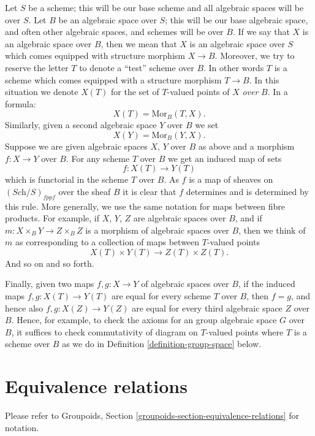 \noindent
Let $S$ be a scheme; this will be our base scheme and all algebraic spaces
will be over $S$. Let $B$ be an algebraic space over $S$; this will be our
base algebraic space, and often other algebraic spaces, and schemes will
be over $B$. If we say that $X$ is an algebraic space over $B$, then we
mean that $X$ is an algebraic space over $S$ which comes equipped with
structure morphism $X \to B$. Moreover, we try to reserve the letter $T$
to denote a ``test'' scheme over $B$. In other words $T$ is a scheme
which comes equipped with a structure morphism $T \to B$.
In this situation we denote $X(T)$ for the set of $T$-valued points of
$X$ {\it over} $B$. In a formula:
$$
X(T) = \text{Mor}_B(T, X).
$$
Similarly, given a second algebraic space $Y$ over $B$ we set
$$
X(Y) = \text{Mor}_B(Y, X).
$$
Suppose we are given algebraic spaces $X$, $Y$ over $B$ as above and a
morphism $f : X \to Y$ over $B$. For any scheme $T$ over $B$ we get an
induced map of sets
$$
f : X(T) \longrightarrow Y(T)
$$
which is functorial in the scheme $T$ over $B$.
As $f$ is a map of sheaves on $(\textit{Sch}/S)_{fppf}$ over the
sheaf $B$ it is clear that $f$ determines and is determined by this rule.
More generally, we use the same notation for maps between fibre
products. For example, if
$X$, $Y$, $Z$ are algebraic spaces over $B$, and if
$m : X \times_B Y \to Z \times_B Z$ is
a morphism of algebraic spaces over $B$, then we think of $m$ as corresponding
to a collection of maps between $T$-valued points
$$
X(T) \times Y(T) \longrightarrow Z(T) \times Z(T).
$$
And so on and so forth.

\medskip\noindent
Finally, given two maps
$f, g : X \to Y$ of algebraic spaces over $B$, if the induced maps
$f, g : X(T) \to Y(T)$ are equal for every scheme $T$ over $B$, then
$f = g$, and hence also $f, g : X(Z) \to Y(Z)$ are equal for
every third algebraic space $Z$ over $B$. Hence, for example,
to check the axioms for an group algebraic space $G$ over $B$, it
suffices to check commutativity of diagram on $T$-valued points
where $T$ is a scheme over $B$ as we do in
Definition \ref{definition-group-space}
below.




\section{Equivalence relations}
\label{section-equivalence-relations}

\noindent
Please refer to
Groupoids, Section \ref{groupoids-section-equivalence-relations}
for notation.

